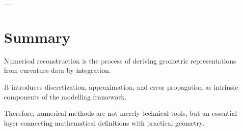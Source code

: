 

---

\section{Summary}

\begin{summary}
Numerical reconstruction is the process of deriving geometric
representations from curvature data by integration.

It introduces discretization, approximation, and error propagation as
intrinsic components of the modelling framework.

Therefore, numerical methods are not merely technical tools, but an
essential layer connecting mathematical definitions with practical
geometry.
\end{summary}
